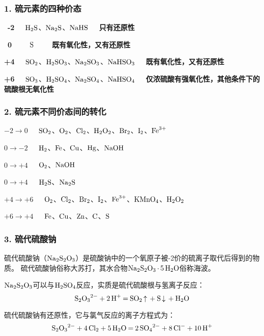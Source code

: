 \documentclass[12pt,a4paper]{ctexbook}
\begin{document}
\subsubsection{1. 硫元素的四种价态}

\ \textbf{-2}\ \ \ $\ce{H2S}$、$\ce{Na2S}$、$\ce{NaHS}$\ \ \ \textbf{只有还原性}

\ \textbf{0}\ \ \ \ \ $\ce{S}$\ \ \ \ \ \textbf{既有氧化性，又有还原性}

\textbf{+4}\ \ \ $\ce{SO2}$、$\ce{H2SO3}$、$\ce{Na2SO3}$、$\ce{NaHSO3}$\ \ \ \textbf{既有氧化性，又有还原性}

\textbf{+6}\ \ \ $\ce{SO3}$、$\ce{H2SO4}$、$\ce{Na2SO4}$、$\ce{NaHSO4}$\ \ \ \textbf{仅浓硫酸有强氧化性，其他条件下的硫酸根无氧化性}

\subsubsection{2. 硫元素不同价态间的转化}

$-2 \rightarrow 0$\ \ \ $\ce{SO2}$、$\ce{O2}$、$\ce{Cl2}$、$\ce{H2O2}$、$\ce{Br2}$、$\ce{I2}$、$\ce{Fe^3+}$

$0 \rightarrow -2$\ \ \ $\ce{H2}$、$\ce{Fe}$、$\ce{Cu}$、$\ce{Hg}$、$\ce{NaOH}$

$0 \rightarrow +4$\ \ \ $\ce{O2}$、$\ce{NaOH}$

$0 \rightarrow +4$\ \ \ $\ce{H2S}$、$\ce{Na2S}$

$+4 \rightarrow +6$\ \ \ $\ce{O2}$、$\ce{Cl2}$、$\ce{Br2}$、$\ce{I2}$、$\ce{Fe^3+}$、$\ce{KMnO4}$、$\ce{H2O2}$

$+6 \rightarrow +4$\ \ \ $\ce{Fe}$、$\ce{Cu}$、$\ce{Zn}$、$\ce{C}$、$\ce{S}$

\subsubsection{3. 硫代硫酸钠}

硫代硫酸钠（$\ce{Na2S2O3}$）是硫酸钠中的一个氧原子被-2价的硫离子取代后得到的物质。
硫代硫酸钠俗称大苏打，其水合物$\ce{Na2S2O3*5H2O}$俗称海波。

$\ce{Na2S2O3}$可以与$\ce{H2SO4}$反应，实质是硫代硫酸根与氢离子反应：
$$\ce{S2O3^2- + 2H^+ = SO2 ^ + S v + H2O}$$

硫代硫酸钠有还原性，它与氯气反应的离子方程式为：
$$\ce{S2O3^2- + 4Cl2 + 5H2O = 2SO4^2- + 8Cl^- + 10H^+}$$
\end{document}

